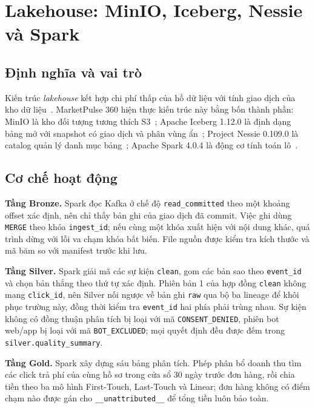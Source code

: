 \section{Lakehouse: MinIO, Iceberg, Nessie và Spark}
\label{sec:c3-lakehouse}

\subsection{Định nghĩa và vai trò}
\label{sec:c3-lakehouse-dinh-nghia}
Kiến trúc \emph{lakehouse} kết hợp chi phí thấp của hồ dữ liệu với tính giao dịch của kho dữ liệu~\cite{armbrust2021lakehouse}. MarketPulse 360 hiện thực kiến trúc này bằng bốn thành phần: MinIO là kho đối tượng tương thích S3~\cite{minio}; Apache Iceberg 1.12.0 là định dạng bảng mở với snapshot có giao dịch và phân vùng ẩn~\cite{icebergspec}; Project Nessie 0.109.0 là catalog quản lý danh mục bảng~\cite{nessie}; Apache Spark 4.0.4 là động cơ tính toán lô~\cite{zaharia2012rdd, sparkdocs}.

\subsection{Cơ chế hoạt động}
\label{sec:c3-lakehouse-co-che}
\textbf{Tầng Bronze.} Spark đọc Kafka ở chế độ \texttt{read\_committed} theo một khoảng offset xác định, nên chỉ thấy bản ghi của giao dịch đã commit. Việc ghi dùng \texttt{MERGE} theo khóa \texttt{ingest\_id}; nếu cùng một khóa xuất hiện với nội dung khác, quá trình dừng với lỗi va chạm khóa bất biến. File nguồn được kiểm tra kích thước và mã băm so với manifest trước khi lưu.

\textbf{Tầng Silver.} Spark giải mã các sự kiện \texttt{clean}, gom các bản sao theo \texttt{event\_id} và chọn bản thắng theo thứ tự xác định. Phiên bản 1 của hợp đồng \texttt{clean} không mang \texttt{click\_id}, nên Silver nối ngược về bản ghi \texttt{raw} qua bộ ba lineage để khôi phục trường này, đồng thời kiểm tra \texttt{event\_id} hai phía phải trùng nhau. Sự kiện không có đồng thuận phân tích bị loại với mã \texttt{CONSENT\_DENIED}, phiên bot web/app bị loại với mã \texttt{BOT\_EXCLUDED}; mọi quyết định đều được đếm trong \texttt{silver.quality\_summary}.

\textbf{Tầng Gold.} Spark xây dựng sáu bảng phân tích. Phép phân bổ doanh thu tìm các click trả phí của cùng hồ sơ trong cửa sổ 30 ngày trước đơn hàng, rồi chia tiền theo ba mô hình First-Touch, Last-Touch và Linear; đơn hàng không có điểm chạm nào được gán cho \texttt{\_\_unattributed\_\_} để tổng tiền luôn bảo toàn.

